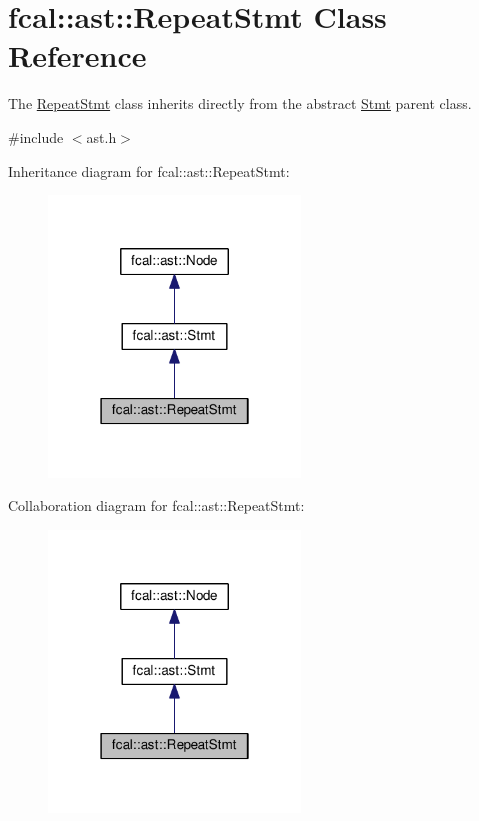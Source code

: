 \hypertarget{classfcal_1_1ast_1_1RepeatStmt}{}\section{fcal\+:\+:ast\+:\+:Repeat\+Stmt Class Reference}
\label{classfcal_1_1ast_1_1RepeatStmt}


The \hyperlink{classfcal_1_1ast_1_1RepeatStmt}{Repeat\+Stmt} class inherits directly from the abstract \hyperlink{classfcal_1_1ast_1_1Stmt}{Stmt} parent class.  




{\ttfamily \#include $<$ast.\+h$>$}



Inheritance diagram for fcal\+:\+:ast\+:\+:Repeat\+Stmt\+:
\nopagebreak
\begin{figure}[H]
\begin{center}
\leavevmode
\includegraphics[width=190pt]{classfcal_1_1ast_1_1RepeatStmt__inherit__graph}
\end{center}
\end{figure}


Collaboration diagram for fcal\+:\+:ast\+:\+:Repeat\+Stmt\+:
\nopagebreak
\begin{figure}[H]
\begin{center}
\leavevmode
\includegraphics[width=190pt]{classfcal_1_1ast_1_1RepeatStmt__coll__graph}
\end{center}
\end{figure}
